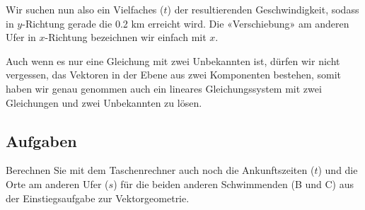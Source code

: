 Wir suchen nun also ein Vielfaches ($t$) der resultierenden
Geschwindigkeit, sodass in $y$-Richtung gerade die 0.2 km erreicht
wird. Die «Verschiebung» am anderen Ufer in $x$-Richtung bezeichnen
wir einfach mit $x$.


\begin{bemerkung}{}{}
  Auch wenn es nur eine Gleichung mit zwei Unbekannten ist, dürfen wir
  nicht vergessen, das Vektoren in der Ebene aus zwei Komponenten
  bestehen, somit haben wir genau genommen auch ein lineares
  Gleichungssystem mit zwei Gleichungen und zwei Unbekannten zu lösen.
  \end{bemerkung}
\newpage
  
\subsection*{Aufgaben}

Berechnen Sie mit dem Taschenrechner auch noch die Ankunftszeiten ($t$) und die Orte am anderen Ufer
($s$) für die beiden anderen Schwimmenden (B und C) aus der
Einstiegsaufgabe zur Vektorgeometrie.


\newpage
